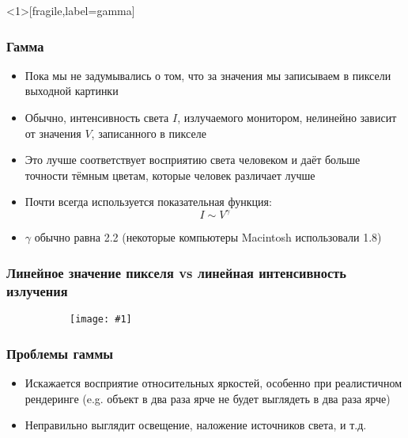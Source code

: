 \documentclass[10pt,handout]{beamer}
\newcommand{\slideimage}[1]{
  \begin{figure}
    \begin{adjustbox}{width=\textwidth, totalheight=\textheight-2\baselineskip-2\baselineskip,keepaspectratio}
      \texttt{[image: \#1]}
    \end{adjustbox}
  \end{figure}
}
\begin{document}
\begin{frame}<1>[fragile,label=gamma]
\frametitle{Гамма}
\begin{itemize}
\item Пока мы не задумывались о том, что за значения мы записываем в пиксели выходной картинки
\pause
\item Обычно, интенсивность света \begin{math}I\end{math}, излучаемого монитором, нелинейно зависит от значения \begin{math}V\end{math}, записанного в пикселе
\pause
\item Это лучше соответствует восприятию света человеком и даёт больше точности тёмным цветам, которые человек различает лучше
\pause
\item Почти всегда используется показательная функция:
\begin{equation}I \sim V^\gamma\end{equation}
\pause
\item \begin{math}\gamma\end{math} обычно равна 2.2 (некоторые компьютеры Macintosh использовали 1.8)
\end{itemize}
\end{frame}

\begin{frame}
\frametitle{Линейное значение пикселя vs линейная интенсивность излучения}
\begin{figure}
\slideimage{gamma-scale.png}
\end{figure}
\end{frame}


\begin{frame}[fragile,label=gamma2]
\frametitle{Проблемы гаммы}
\begin{itemize}
\item Искажается восприятие относительных яркостей, особенно при реалистичном рендеринге (e.g. объект в два раза ярче не будет выглядеть в два раза ярче)
\pause
\item Неправильно выглядит освещение, наложение источников света, и т.д.
\end{itemize}
\end{frame}
\end{document}
